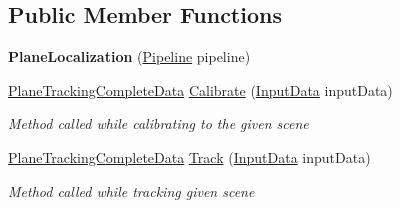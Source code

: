 \subsection*{Public Member Functions}
\begin{DoxyCompactItemize}
\item 
\mbox{\label{class_chess_tracking_1_1_image_processing_1_1_pipeline_parts_1_1_stages_1_1_plane_localization_a5f78fbdc5844408feaa7e54f289349ce}} 
{\bfseries Plane\+Localization} (\mbox{\hyperlink{class_chess_tracking_1_1_image_processing_1_1_pipeline_parts_1_1_general_1_1_pipeline}{Pipeline}} pipeline)
\item 
\mbox{\hyperlink{class_chess_tracking_1_1_image_processing_1_1_pipeline_data_1_1_plane_tracking_complete_data}{Plane\+Tracking\+Complete\+Data}} \mbox{\hyperlink{class_chess_tracking_1_1_image_processing_1_1_pipeline_parts_1_1_stages_1_1_plane_localization_a85e3456fc26b865f16bb985efd5e41a7}{Calibrate}} (\mbox{\hyperlink{class_chess_tracking_1_1_image_processing_1_1_pipeline_data_1_1_input_data}{Input\+Data}} input\+Data)
\begin{DoxyCompactList}\small\item\em Method called while calibrating to the given scene \end{DoxyCompactList}\item 
\mbox{\hyperlink{class_chess_tracking_1_1_image_processing_1_1_pipeline_data_1_1_plane_tracking_complete_data}{Plane\+Tracking\+Complete\+Data}} \mbox{\hyperlink{class_chess_tracking_1_1_image_processing_1_1_pipeline_parts_1_1_stages_1_1_plane_localization_a37055795945cfe41324cbc59e3563b2e}{Track}} (\mbox{\hyperlink{class_chess_tracking_1_1_image_processing_1_1_pipeline_data_1_1_input_data}{Input\+Data}} input\+Data)
\begin{DoxyCompactList}\small\item\em Method called while tracking given scene \end{DoxyCompactList}\end{DoxyCompactItemize}
